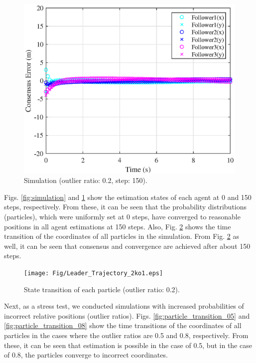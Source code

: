 \documentclass[a4paper,fleqn,10pt,twocolumn]{SICE_ISCS}
\begin{document}
\begin{figure}[t]
	\begin{center}
		\includegraphics[width=\linewidth]{Fig/sampleconsensus.eps}
		\caption{Simulation (outlier ratio: 0.2, step: 150).}
		\label{fig:simulation_150}
	\end{center}
	\vspace{-2mm}
\end{figure}

Figs. \ref{fig:simulation} and \ref{fig:simulation_150} show the estimation states of each agent at 0 and 150 steps, respectively. From these, it can be seen that the probability distributions (particles), which were uniformly set at 0 steps, have converged to reasonable positions in all agent estimations at 150 steps. Also, Fig. \ref{fig:particle_transition} shows the time transition of the coordinates of all particles in the simulation. From Fig. \ref{fig:particle_transition} as well, it can be seen that consensus and convergence are achieved after about 150 steps.

\begin{figure}[t]
	\begin{center}
		\texttt{[image: Fig/Leader\_Trajectory\_2ko1.eps]}
		\caption{State transition of each particle (outlier ratio: 0.2).}
		\label{fig:particle_transition}
	\end{center}
	\vspace{-2mm}
\end{figure}

Next, as a stress test, we conducted simulations with increased probabilities of incorrect relative positions (outlier ratios). Figs. \ref{fig:particle_transition_05} and \ref{fig:particle_transition_08} show the time transitions of the coordinates of all particles in the cases where the outlier ratios are 0.5 and 0.8, respectively. From these, it can be seen that estimation is possible in the case of 0.5, but in the case of 0.8, the particles converge to incorrect coordinates.
\end{document}
